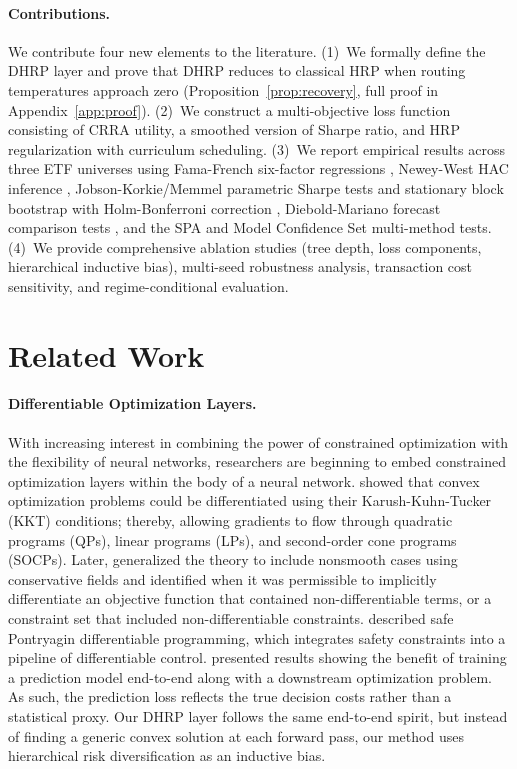 \paragraph{Contributions.} We contribute four new elements to the literature. (1)~We formally define the DHRP layer and prove that DHRP reduces to classical HRP when routing temperatures approach zero (Proposition~\ref{prop:recovery}, full proof in Appendix~\ref{app:proof}). (2)~We construct a multi-objective loss function consisting of CRRA utility, a smoothed version of Sharpe ratio, and HRP regularization with curriculum scheduling. (3)~We report empirical results across three ETF universes using Fama-French six-factor regressions \citep{Carhart1997, FamaFrench2015}, Newey-West HAC inference \citep{NeweyWest1987}, Jobson-Korkie/Memmel parametric Sharpe tests \citep{JobsonKorkie1981, Memmel2003} and stationary block bootstrap \citep{PolitisRomano1994} with Holm-Bonferroni correction \citep{Holm1979}, Diebold-Mariano forecast comparison tests \citep{DieboldMariano1995}, and the SPA \citep{Hansen2005} and Model Confidence Set \citep{HansenLundeNason2011} multi-method tests. (4)~We provide comprehensive ablation studies (tree depth, loss components, hierarchical inductive bias), multi-seed robustness analysis, transaction cost sensitivity, and regime-conditional evaluation.

\section{Related Work}

\paragraph{Differentiable Optimization Layers.} With increasing interest in combining the power of constrained optimization with the flexibility of neural networks, researchers are beginning to embed constrained optimization layers within the body of a neural network. \citet{Agrawal2019} showed that convex optimization problems could be differentiated using their Karush-Kuhn-Tucker (KKT) conditions; thereby, allowing gradients to flow through quadratic programs (QPs), linear programs (LPs), and second-order cone programs (SOCPs). Later, \citet{Bolte2021} generalized the theory to include nonsmooth cases using conservative fields and identified when it was permissible to implicitly differentiate an objective function that contained non-differentiable terms, or a constraint set that included non-differentiable constraints. \citet{Jin2021} described safe Pontryagin differentiable programming, which integrates safety constraints into a pipeline of differentiable control. \citet{Donti2017} presented results showing the benefit of training a prediction model end-to-end along with a downstream optimization problem. As such, the prediction loss reflects the true decision costs rather than a statistical proxy. Our DHRP layer follows the same end-to-end spirit, but instead of finding a generic convex solution at each forward pass, our method uses hierarchical risk diversification as an inductive bias.

